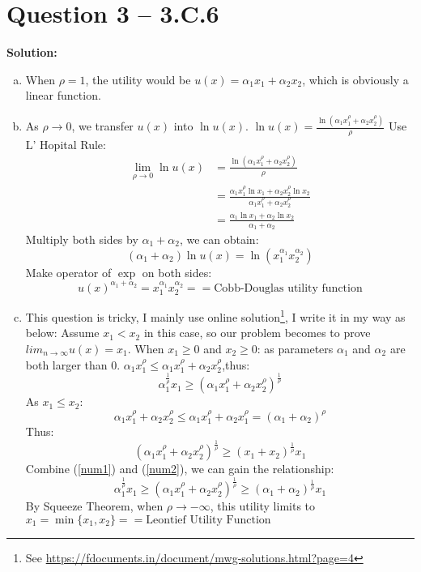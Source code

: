 \documentclass[11pt]{article} %
\begin{document}
\section{Question 3 -- 3.C.6}
\textbf{Solution:}
\begin{enumerate}[(a)]
	\item When $\rho=1$, the utility would be $u(x)=\alpha_1x_1+\alpha_2x_2$, which is obviously a linear function.
	\item As $\rho \rightarrow 0$, we transfer $u(x)$ into $\ln u(x)$. $\ln u(x)=\frac{\ln (\alpha_1x_1^\rho+\alpha_2x_2^\rho)}{\rho}$
		Use L' Hopital Rule:
		\begin{align*}
			\lim_{\rho\rightarrow 0} \ln u(x)&=\frac{\ln (\alpha_1x_1^\rho+\alpha_2x_2^\rho)}{\rho}\\
											&= \frac{\alpha_1x_1^\rho\ln x_1+\alpha_2x_2^\rho\ln x_2}{\alpha_1x_1^\rho+\alpha_2x_2^\rho}\\
											&=\frac{\alpha_1  \ln x_1+\alpha_2 \ln x_2}{\alpha_1+\alpha_2}
		\end{align*}
		Multiply both sides by $\alpha_1+\alpha_2$, we can obtain:
		\begin{equation*}
			(\alpha_1+\alpha_2)\ln u(x)=\ln (x_1^{\alpha_1}x_2^{\alpha_2})
		\end{equation*}
		Make operator of $\exp$ on both sides:
		\begin{equation*}
			u(x)^{\alpha_1+\alpha_2}=x_1^{\alpha_1}x_2^{\alpha_2}==\text{Cobb-Douglas utility function}
		\end{equation*}
	\item This question is tricky, I mainly use online solution\footnote{See \url{https://fdocuments.in/document/mwg-solutions.html?page=4}}, I write it in my way as below:
		Assume $x_1<x_2$ in this case, so our problem becomes to prove $lim_{n\rightarrow \infty}u(x)=x_1$.
		When $x_1\geq 0$ and $x_2\geq 0$: as parameters $\alpha_1$ and $\alpha_2$ are both larger than 0. $\alpha_1x_1^\rho\leq \alpha_1x_1^\rho+ \alpha_2x_2^\rho$,thus:
		\begin{equation}\tag*{3.C.6(1)}\label{num1}
			\alpha_1^{\frac{1}{\rho}}x_1\geq (\alpha_1x_1^\rho+\alpha_2x_2^\rho)^{\frac{1}{\rho}}
		\end{equation}
		As $x_1\leq x_2$:
		\begin{equation*}
			\alpha_1x_1^\rho+\alpha_2x_2^\rho\leq \alpha_1x_1^\rho+\alpha_2x_1^\rho=(\alpha_1+\alpha_2)^\rho
		\end{equation*}
		Thus:
		\begin{equation}\tag*{3.C.6(2)}\label{num2}
			(\alpha_1x_1^\rho+\alpha_2x_2^\rho)^{\frac{1}{\rho}}\geq (x_1+x_2)^{\frac{1}{\rho}}x_1
		\end{equation}
		Combine (\ref{num1}) and (\ref{num2}),  we can gain the relationship:
		\begin{equation*}
			\alpha_1^{\frac{1}{\rho}}x_1\geq (\alpha_1x_1^\rho+\alpha_2x_2^\rho)^{\frac{1}{\rho}} \geq (\alpha_1+\alpha_2)^{\frac{1}{\rho}}x_1
		\end{equation*}
		By Squeeze Theorem, when $\rho \rightarrow -\infty$, this utility limits to $x_1=\min\{x_1,x_2\}==\text{Leontief Utility Function}$
\end{enumerate}
\end{document}
